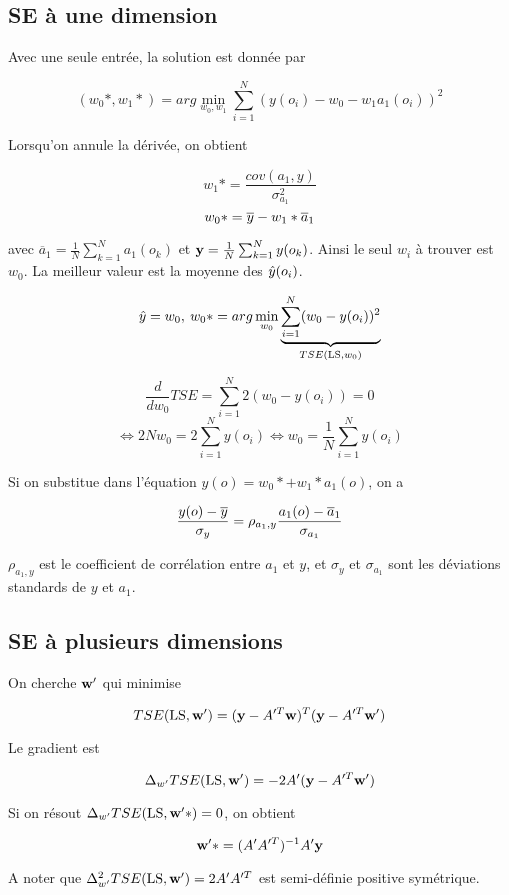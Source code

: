 		\subsection{SE à une dimension}
		
		Avec une seule entrée, la solution est donnée par
		
		$$(w_0*, w_1*) = arg \min_{w_0, w_1} \sum_{i = 1}^N (y(o_i) - w_0 - w_1a_1(o_i))^2$$
		
		Lorsqu'on annule la dérivée, on obtient
		
		$$w_1* = \frac{cov(a_1, y)}{\sigma^2_{a_1}}$$
		$$w_0* = \overline{y} - w_1*\overline{a}_1$$
		
		avec $\overline{a}_1 = \frac{1}{N} \sum_{k = 1}^Na_1(o_k)$ et $\textbf{y} = \frac{1}{N} \sum_{k = 1}^N y(o_k)$. Ainsi le seul $w_i$ à trouver est $w_0$. La meilleur valeur est la moyenne des $\hat{y}(o_i)$.
		
		$$\hat{y} = w_0, \: w_0* = arg \min_{w_0} \underbrace{\sum_{i = 1}^N (w_0 - y(o_i))^2}_{TSE(\text{LS}, w_0)}$$
		
		$$\frac{d}{dw_0} TSE = \sum_{i = 1}^N 2(w_0 - y(o_i)) = 0$$
		$$\Leftrightarrow 2 N w_0 = 2 \sum_{i = 1}^N y(o_i) \Leftrightarrow w_0 = \frac{1}{N} \sum_{i = 1}^N y(o_i)$$
		
		Si on substitue dans l'équation $y(o) = w_0* + w_1*a_1(o)$, on a
		
		$$\frac{y(o) - \overline{y}}{\sigma_y} = \rho_{a_1, y} \frac{a_1(o) - \overline{a}_1}{\sigma_{a_1}}$$
		
		$\rho_{a_1, y}$ est le coefficient de corrélation entre $a_1$ et $y$, et $\sigma_y$ et $\sigma_{a_1}$ sont les déviations standards de $y$ et $a_1$.
		
		\subsection{SE à plusieurs dimensions}
		
		On cherche $\textbf{w}'$ qui minimise
		
		$$TSE(\text{LS}, \textbf{w}') = (\textbf{y} - A'^T\textbf{w})^T(\textbf{y} - A'^T\textbf{w}')$$
		
		Le gradient est
		
		$$\Delta_{w'} TSE(\text{LS}, \textbf{w}') = -2 A' (\textbf{y} - A'^T\textbf{w}')$$
		
		Si on résout $\Delta_{w'} TSE(\text{LS}, \textbf{w}'*) = 0$, on obtient
		
		$$\textbf{w}'* = (A'A'^T)^{-1}A'\textbf{y}$$
		
		A noter que $\Delta^2_{w'} TSE(\text{LS}, \textbf{w}') = 2A'A'^T$ est semi-définie positive symétrique.
		
